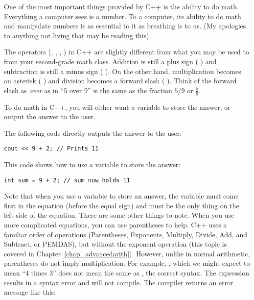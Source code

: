 

One of the most important things provided by C++ is the ability to do math. 
Everything a computer sees is a number.
To a computer, its ability to do math and manipulate numbers is as essential to it as breathing is to us. 
(My apologies to anything not living that may be reading this).

The operators (\Code{+}, \Code{-}, \Code{*}, \Code{/}) in C++ are slightly different from what you may be used to from your second-grade math class. 
Addition is still a plus sign ( \Code{+} ) and subtraction is still a minus sign ( \Code{-} ). 
On the other hand, multiplication becomes an asterisk ( \Code{*} ) and division becomes a forward slash ( \Code{/} ). 
Think of the forward slash as \textit{over} as in ``5 over 9'' is the same as the fraction $5/9$ or $\frac{5}{9}$.

To do math in C++, you will either want a variable to store the answer, or output the answer to the user. 

The following code directly outputs the answer to the user: \nopagebreak[4]

\noindent\begin{minipage}{\linewidth}\begin{lstlisting}
cout << 9 + 2; // Prints 11
\end{lstlisting}\end{minipage}

This code shows how to use a variable to store the answer: \nopagebreak[4]

\noindent\begin{minipage}{\linewidth}\begin{lstlisting}
int sum = 9 + 2; // sum now holds 11
\end{lstlisting}\end{minipage}

Note that when you use a variable to store an answer, the variable must come first in the equation (before the equal sign) and must be the only thing on the left side of the equation. 
There are some other things to note.
When you use more complicated equations, you can use parentheses to help. 
C++ uses a familiar order of operations (Parentheses, Exponents, Multiply, Divide, Add, and Subtract, or PEMDAS), but without the exponent operation (this topic is covered in Chapter~\ref{chap_advancedarith}). 
However, unlike in normal arithmetic, parentheses do not imply multiplication. 
For example, , which we might expect to mean ``4 times 3'' does not mean the same as , the correct syntax. 
The expression  results in a syntax error and will not compile. 
The compiler returns an error message like this: 


